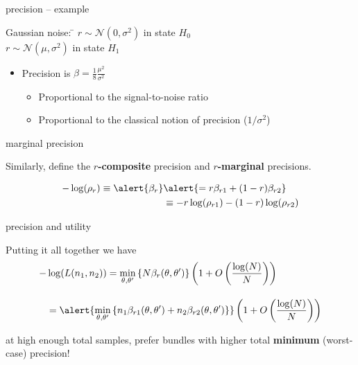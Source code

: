 \documentclass[square,]{gBakerBeamer}
\renewcommand{\|}{\,|\,}
\begin{document}
\begin{frame}{precision -- example}

  \begin{tabbing}
    Gaussian noise: \= $r\sim \mathcal{N}(0,\sigma^2)$ in state $H_0$\\
    \> $r\sim \mathcal{N}(\mu,\sigma^2)$ in state $H_1$
  \end{tabbing}

  \begin{itemize}
    \item<2-> Precision is $\beta =
          \frac{1}{8}\frac{\mu^2}{\sigma^2}$
          \begin{itemize}
            \item<3-> Proportional to the signal-to-noise ratio
            \item<3-> Proportional to the classical notion of precision ($1/\sigma^2$)
          \end{itemize}
  \end{itemize}

  \note{%

  }
\end{frame}


\begin{frame}{marginal precision}

  Similarly, define the \textbf{$r$-composite} precision and \textbf{$r$-marginal} precisions.

  \begin{align*}
    -\log(\rho_r)
    \equiv \alert{\beta_r} & \alert{=r\beta_{r1} + (1-r)\beta_{r2}}\\
                  &\equiv -r\log(\rho_{r1}) - (1-r)\log(\rho_{r2})
  \end{align*}

  \note{%

  }
\end{frame}


\begin{frame}{precision and utility}

  Putting it all together we have
  \begin{align*}
    -&\log(L(n_1,n_2)) = \min_{\theta,\theta'} \left\{ N\beta_r(\theta,\theta') \right\}
       \left(
       1 + O \left( \log(N) \over N \right)
       \right)\\[1em]
     &= \alert{\min_{\theta,\theta'}
       \left\{ n_1\beta_{r1}(\theta,\theta') + n_2\beta_{r2}(\theta,\theta') \right\}}
       \left(
       1 + O \left( \log(N) \over N \right)
       \right)
  \end{align*}\pause

  at high enough total samples, prefer bundles with higher total \textbf{minimum} (worst-case) precision!

  \note{%

  }
\end{frame}
\end{document}
